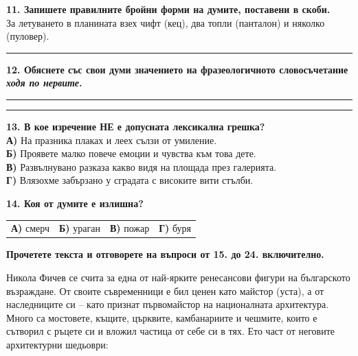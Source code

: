 \documentclass[12pt,a4paper]{article}
\begin{document}
\noindent
\textbf{11. Запишете правилните бройни форми на думите, поставени в скоби.} \\
За летуването в планината взех чифт (кец), два топли (панталон) и няколко (пуловер).

\vspace{0.2cm}
\noindent\rule{\linewidth}{0.4pt}

\vspace{0.6cm}

\noindent
\textbf{12. Обяснете със свои думи значението на фразеологичното словосъчетание \textit{ходя по нервите}.}

\vspace{0.2cm}
\noindent\rule{\linewidth}{0.4pt}
\noindent\rule{\linewidth}{0.4pt}

\vspace{0.4cm}

\noindent
\textbf{13. В кое изречение НЕ е допусната лексикална грешка?} \\
\textbf{А)} На празника плаках и леех сълзи от умиление. \\
\textbf{Б)} Проявете малко повече емоции и чувства към това дете. \\
\textbf{В)} Развълнувано разказа какво видя на площада през галерията. \\
\textbf{Г)} Влязохме забързано у сградата с високите вити стълби.

\vspace{0.6cm}

\noindent
\textbf{14. Коя от думите е излишна?} \\
\begin{tabular}{@{}p{} p{} p{} p{}@{}}
\textbf{А)} смерч & \textbf{Б)} ураган & \textbf{В)} пожар & \textbf{Г)} буря
\end{tabular}

\vspace{0.6cm}

\noindent
\textbf{Прочетете текста и отговорете на въпроси от 15. до 24. включително.}

\vspace{0.3cm}

\noindent
Никола Фичев се счита за една от най-ярките ренесансови фигури на българското възраждане. От своите съвременници е бил ценен като майстор (уста), а от наследниците си – като признат първомайстор на националната архитектура. Много са мостовете, къщите, църквите, камбанариите и чешмите, които е сътворил с ръцете си и вложил частица от себе си в тях. Ето част от неговите архитектурни шедьоври:
\end{document}
